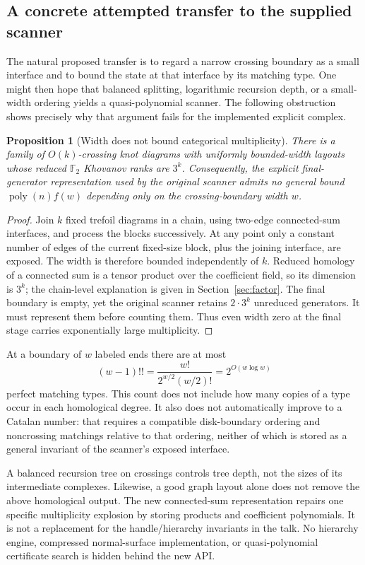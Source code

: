 \documentclass[11pt]{article}
\newtheorem{proposition}{Proposition}[section]
\newcommand{\F}{\mathbb F}
\newcommand{\poly}{\operatorname{poly}}
\begin{document}
\subsection{A concrete attempted transfer to the supplied scanner}

The natural proposed transfer is to regard a narrow crossing boundary as a
small interface and to bound the state at that interface by its matching type.
One might then hope that balanced splitting, logarithmic recursion depth, or a
small-width ordering yields a quasi-polynomial scanner. The following obstruction
shows precisely why that argument fails for the implemented explicit complex.

\begin{proposition}[Width does not bound categorical multiplicity]
There is a family of $O(k)$-crossing knot diagrams with uniformly bounded-width
layouts whose reduced $\F_2$ Khovanov ranks are $3^k$. Consequently, the explicit
final-generator representation used by the original scanner admits no general
bound $\poly(n)f(w)$ depending only on the crossing-boundary width $w$.
\end{proposition}
\begin{proof}
Join $k$ fixed trefoil diagrams in a chain, using two-edge connected-sum
interfaces, and process the blocks successively. At any point only a constant
number of edges of the current fixed-size block, plus the joining interface,
are exposed. The width is therefore bounded independently of $k$.
Reduced homology of a connected sum is a tensor product over the coefficient
field, so its dimension is $3^k$; the chain-level explanation is given in
Section~\ref{sec:factor}. The final boundary is empty, yet the original scanner
retains $2\cdot3^k$ unreduced generators. It must represent them before counting
them. Thus even width zero at the final stage carries exponentially large
multiplicity.
\end{proof}

At a boundary of $w$ labeled ends there are at most
\[
 (w-1)!!=\frac{w!}{2^{w/2}(w/2)!}=2^{O(w\log w)}
\]
perfect matching types. This count does not include how many copies of a type
occur in each homological degree. It also does not automatically improve to a
Catalan number: that requires a compatible disk-boundary ordering and
noncrossing matchings relative to that ordering, neither of which is stored
as a general invariant of the scanner's exposed interface.

A balanced recursion tree on crossings controls tree depth, not the sizes of
its intermediate complexes. Likewise, a good graph layout alone does not remove
the above homological output. The new connected-sum representation repairs one
specific multiplicity explosion by storing products and coefficient
polynomials. It is not a replacement for the handle/hierarchy invariants in the
talk. No hierarchy engine, compressed normal-surface implementation, or
quasi-polynomial certificate search is hidden behind the new API.
\end{document}
